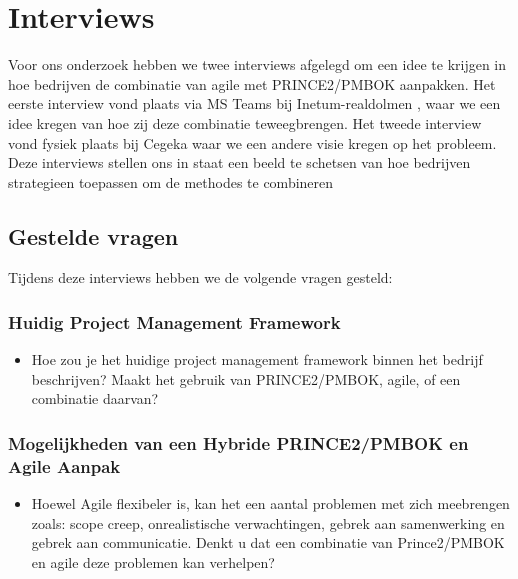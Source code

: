 \documentclass[dutch]{hogent-article}
\begin{document}
 

\section{Interviews}
\label{sec:interviews}
Voor ons onderzoek hebben we twee interviews afgelegd om een idee te krijgen
in hoe bedrijven de combinatie van agile met PRINCE2/PMBOK aanpakken.
Het eerste interview vond plaats via MS Teams bij Inetum-realdolmen
, waar we een idee kregen van hoe zij deze combinatie teweegbrengen. Het tweede interview vond fysiek plaats
bij Cegeka waar we een andere visie kregen op het probleem. Deze interviews stellen ons in staat een beeld te schetsen van hoe bedrijven strategieen toepassen om de methodes te combineren

\subsection{Gestelde vragen}%
\label{ssec:gestelde-vragen}

Tijdens deze interviews hebben we de volgende vragen gesteld:

\subsubsection{Huidig Project Management Framework}
\label{ssec:Huidig Project Management Framework}

\begin{itemize}
    \item Hoe zou je het huidige project management framework binnen het bedrijf beschrijven? Maakt het gebruik van PRINCE2/PMBOK, agile, of een combinatie daarvan?
\end{itemize}

\subsubsection{Mogelijkheden van een Hybride PRINCE2/PMBOK en Agile Aanpak}
\label{ssec:Mogelijkheden en uitdagingen van een Hybride PRINCE2/PMBOK en Agile Aanpak}

\begin{itemize}
    \item Hoewel Agile flexibeler is, kan het een aantal  problemen met zich meebrengen zoals: scope creep, onrealistische verwachtingen, gebrek aan samenwerking en gebrek aan communicatie. Denkt u dat een combinatie van Prince2/PMBOK en agile deze problemen kan verhelpen?
\end{itemize}
\end{document}
